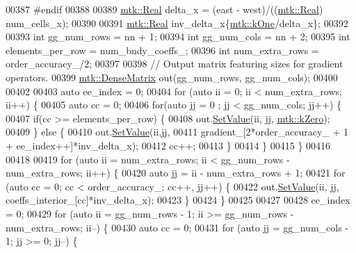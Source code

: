 \begin{DoxyCode}
{{00387 \textcolor{preprocessor}{  #endif}
00388 
00389   \hyperlink{group__c01-roots_gac080bbbf5cbb5502c9f00405f894857d}{mtk::Real} delta\_x = (east - west)/((\hyperlink{group__c01-roots_gac080bbbf5cbb5502c9f00405f894857d}{mtk::Real}) num\_cells\_x);
00390 
00391   \hyperlink{group__c01-roots_gac080bbbf5cbb5502c9f00405f894857d}{mtk::Real} inv\_delta\_x\{\hyperlink{group__c01-roots_ga26407c24d43b6b95480943340d285c71}{mtk::kOne}/delta\_x\};
00392 
00393   \textcolor{keywordtype}{int} gg\_num\_rows = nn + 1;
00394   \textcolor{keywordtype}{int} gg\_num\_cols = nn + 2;
00395   \textcolor{keywordtype}{int} elements\_per\_row = num\_bndy\_coeffs\_;
00396   \textcolor{keywordtype}{int} num\_extra\_rows = order\_accuracy\_/2;
00397 
00398   \textcolor{comment}{// Output matrix featuring sizes for gradient operators.}
00399   \hyperlink{classmtk_1_1DenseMatrix}{mtk::DenseMatrix} out(gg\_num\_rows, gg\_num\_cols);
00400 
00402 
00403   \textcolor{keyword}{auto} ee\_index = 0;
00404   \textcolor{keywordflow}{for} (\textcolor{keyword}{auto} ii = 0; ii < num\_extra\_rows; ii++) \{
00405     \textcolor{keyword}{auto} cc = 0;
00406     \textcolor{keywordflow}{for}(\textcolor{keyword}{auto} jj = 0 ; jj < gg\_num\_cols; jj++) \{
00407       \textcolor{keywordflow}{if}(cc >= elements\_per\_row) \{
00408         out.\hyperlink{classmtk_1_1DenseMatrix_a784ce5784109ac86bfb9d8562b334b13}{SetValue}(ii, jj, \hyperlink{group__c01-roots_ga59a451a5fae30d59649bcda274fea271}{mtk::kZero});
00409       \} \textcolor{keywordflow}{else} \{
00410         out.\hyperlink{classmtk_1_1DenseMatrix_a784ce5784109ac86bfb9d8562b334b13}{SetValue}(ii,jj,
00411                      gradient\_[2*order\_accuracy\_ + 1 + ee\_index++]*inv\_delta\_x);
00412         cc++;
00413       \}
00414     \}
00415   \}
00416 
00418 
00419   \textcolor{keywordflow}{for} (\textcolor{keyword}{auto} ii = num\_extra\_rows; ii < gg\_num\_rows - num\_extra\_rows; ii++) \{
00420     \textcolor{keyword}{auto} jj = ii - num\_extra\_rows + 1;
00421     \textcolor{keywordflow}{for} (\textcolor{keyword}{auto} cc = 0; cc < order\_accuracy\_; cc++, jj++) \{
00422       out.\hyperlink{classmtk_1_1DenseMatrix_a784ce5784109ac86bfb9d8562b334b13}{SetValue}(ii, jj, coeffs\_interior\_[cc]*inv\_delta\_x);
00423     \}
00424   \}
00425 
00427 
00428   ee\_index = 0;
00429   \textcolor{keywordflow}{for} (\textcolor{keyword}{auto} ii = gg\_num\_rows - 1; ii >= gg\_num\_rows - num\_extra\_rows; ii--) \{
00430     \textcolor{keyword}{auto} cc = 0;
00431     \textcolor{keywordflow}{for} (\textcolor{keyword}{auto} jj = gg\_num\_cols - 1; jj >= 0; jj--) \{
}}
\end{DoxyCode}
